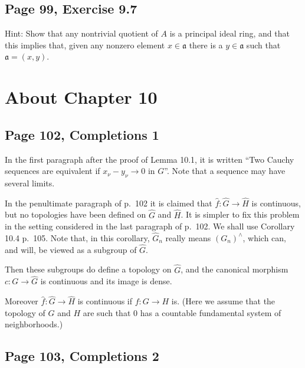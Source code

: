 \documentclass[parskip=half,fontsize=12pt]{scrartcl}%
\newcommand{\mf}{\mathfrak}
\newcommand{\aaa}{\mf a}
\begin{document}
\subsection{Page 99, Exercise 9.7}%

Hint: Show that any nontrivial quotient of $A$ is a principal ideal ring, and that this implies that, given any nonzero element $x\in\aaa$ there is a $y\in\aaa$ such that $\aaa=(x,y)$. 

\section{About Chapter 10}%

\subsection{Page 102, Completions 1}%

In the first paragraph after the proof of Lemma 10.1, it is written ``Two Cauchy sequences are equivalent if $x_\nu-y_\nu\to0$ in $G$''. Note that a sequence may have several limits.%

In the penultimate paragraph of p.~102 it is claimed that $\widehat f:\widehat G\to\widehat H$ is continuous, but no topologies have been defined on $\widehat G$ and $\widehat H$. It is simpler to fix this problem in the setting considered in the last paragraph of p.~102. We shall use Corollary 10.4 p.~105. Note that, in this corollary, $\widehat G_n$ really means $(G_n)^\wedge$, which can, and will, be viewed as a subgroup of $\widehat G$. 

Then these subgroups do define a topology on $\widehat G$, and the canonical morphism $c:G\to\widehat G$ is continuous and its image is dense. 

Moreover $\widehat f:\widehat G\to\widehat H$ is continuous if $f:G\to H$ is. (Here we assume that the topology of $G$ and $H$ are such that $0$ has a countable fundamental system of neighborhoods.)


\subsection{Page 103, Completions 2}%
\end{document}
